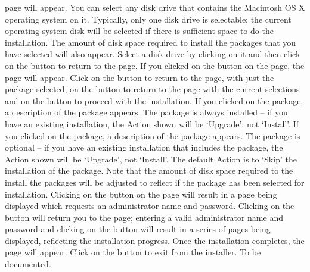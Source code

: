  page will appear.
You can select any disk drive that contains the Macintosh OS X operating system on it.
Typically, only one disk drive is selectable; the current operating system disk will be
selected if there is sufficient space to do the installation.
The amount of disk space required to install the packages that you have selected will also
appear.
Select a disk drive by clicking on it and then click on the  button
to return to the  page.
\newpage
If you clicked on the  button on the 
page, the  page will appear.
Click on the  button to return to the
 page, with just the  package selected, on the
 button to return to the  page with the
current selections and on the  button to proceed with the installation.
\newpage
If you clicked on the  package, a description of the package appears.
The  package is always installed -- if you have an existing \mplusm{}
installation, the Action shown will be `Upgrade', not `Install'.
\newpage
If you clicked on the  package, a description of the package appears.
The  package is optional -- if you have an existing \mplusm{}
installation that includes the  package, the Action shown will be
`Upgrade', not `Install'.
The default Action is to `Skip' the installation of the  package.
Note that the amount of disk space required to the install the packages will be adjusted
to reflect if the  package has been selected for installation.
\newpage
Clicking on the  button on the  page
will result in a page being displayed which requests an administrator name and password.
Clicking on the  button will return you to the
 page; entering a valid administrator name and password and
clicking on the  button will result in a series of pages
being displayed, reflecting the installation progress.
\newpage
Once the installation completes, the  page will appear.
Click on the  button to exit from the installer.
\newpage
\tertiaryEnd{}
\tertiaryEnd{}
\secondaryEnd{}
\newpage
{}
To be documented.
\secondaryEnd{}
\primaryEnd{}
